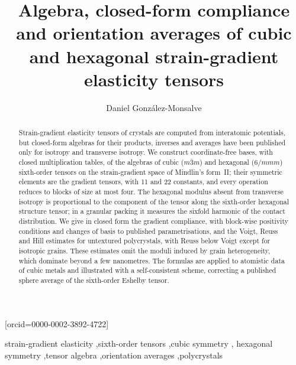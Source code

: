 \documentclass[a4paper,fleqn]{cas-sc}
\theoremstyle{remark}
\begin{document}
\let\WriteBookmarks\relax
\def\floatpagepagefraction{1}
\def\textpagefraction{.001}


\title[mode=title]{Algebra, closed-form compliance and orientation averages of cubic and
hexagonal strain-gradient elasticity tensors}

\author[1]{Daniel Gonz\'alez-Monsalve}[orcid=0000-0002-3892-4722]
\cormark[1]



\begin{abstract}
Strain-gradient elasticity tensors of crystals are computed from interatomic
potentials, but closed-form algebras for their products, inverses and averages have been
published only for isotropy and transverse isotropy. We construct coordinate-free bases,
with closed multiplication tables, of the algebras of cubic ($m\bar3m$) and hexagonal
($6/mmm$) sixth-order tensors on the strain-gradient space of Mindlin's form~II; their
symmetric elements are the gradient tensors, with 11 and 22 constants, and every operation
reduces to blocks of size at most four. The hexagonal modulus absent from
transverse isotropy is proportional to the component of the tensor along the sixth-order
hexagonal structure tensor; in a granular packing it measures the sixfold harmonic of the
contact distribution. We give in closed form the gradient compliance, with block-wise
positivity conditions and changes of basis to published parametrisations, and the
Voigt, Reuss and Hill estimates for untextured polycrystals, with Reuss below Voigt except
for isotropic grains. These estimates omit the moduli induced by grain heterogeneity,
which dominate beyond a few nanometres. The formulas are applied to atomistic data of
cubic metals and illustrated with a self-consistent scheme, correcting a published sphere
average of the sixth-order Eshelby tensor.
\end{abstract}

\begin{keywords}
strain-gradient elasticity \sep sixth-order tensors \sep cubic symmetry \sep
hexagonal symmetry \sep tensor algebra \sep orientation averages \sep polycrystals
\end{keywords}
\end{document}

